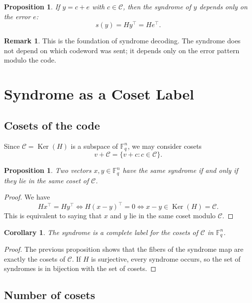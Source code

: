 \documentclass[11pt]{article}
\newcommand{\F}{\mathbb{F}}
\newcommand{\Ker}{\operatorname{Ker}}
\newcommand{\cC}{\mathcal{C}}
\theoremstyle{definition}
\newtheorem{remark}[definition]{Remark}
\theoremstyle{plain}
\newtheorem{proposition}[definition]{Proposition}
\newtheorem{corollary}[definition]{Corollary}
\begin{document}
	\begin{proposition}
		If \(y=c+e\) with \(c\in \cC\), then the syndrome of \(y\) depends only on the error \(e\):
		\[
		s(y)=Hy^\top=He^\top.
		\]
	\end{proposition}
	
	\begin{remark}
		This is the foundation of syndrome decoding. The syndrome does not depend on which codeword was sent; it depends only on the error pattern modulo the code.
	\end{remark}
	
	\section{Syndrome as a Coset Label}
	
	\subsection{Cosets of the code}
	
	Since \(\cC=\Ker(H)\) is a subspace of \(\F_q^n\), we may consider cosets
	\[
	v+\cC = \{v+c : c\in \cC\}.
	\]
	
	\begin{proposition}
		Two vectors \(x,y\in \F_q^n\) have the same syndrome if and only if they lie in the same coset of \(\cC\).
	\end{proposition}
	
	\begin{proof}
		We have
		\[
		Hx^\top = Hy^\top
		\iff H(x-y)^\top=0
		\iff x-y\in \Ker(H)=\cC.
		\]
		This is equivalent to saying that \(x\) and \(y\) lie in the same coset modulo \(\cC\).
	\end{proof}
	
	\begin{corollary}
		The syndrome is a complete label for the cosets of \(\cC\) in \(\F_q^n\).
	\end{corollary}
	
	\begin{proof}
		The previous proposition shows that the fibers of the syndrome map are exactly the cosets of \(\cC\). If \(H\) is surjective, every syndrome occurs, so the set of syndromes is in bijection with the set of cosets.
	\end{proof}
	
	\subsection{Number of cosets}
	
\end{document}
